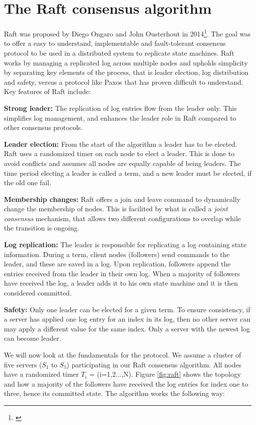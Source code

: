 \section{The Raft consensus algorithm}

Raft was proposed by Diego Ongaro and John Ousterhout in 2014\footnote{\cite{Ongaro2014}}. The goal was to offer a easy to understand, implementable and fault-tolerant consensus protocol to be used in a distributed system to replicate state machines. Raft works by managing a replicated log across multiple nodes and upholds simplicity by separating key elements of the process, that is leader election, log distribution and safety, versus a protocol like Paxos that has proven difficult to understand. Key features of Raft include:

\noindent \textbf{Strong leader:} The replication of log entries flow from the leader only. This simplifies log management, and enhances the leader role in Raft compared to other consensus protocols.

\noindent \textbf{Leader election:} From the start of the algorithm a leader has to be elected. Raft uses a randomized timer on each node to elect a leader. This is done to avoid conflicts and assumes all nodes are equally capable of being leaders. The time period electing a leader is called a term, and a new leader must be elected, if the old one fail.

\noindent \textbf{Membership changes:} Raft offers a join and leave command to dynamically change the membership of nodes. This is facilited by what is called a \textit{joint consensus} mechanism, that allows two different configurations to overlap while the transition is ongoing.

\noindent \textbf{Log replication:} The leader is responsible for replicating a log containing state information. During a term, client nodes (followers) send commands to the leader, and these are saved in a log. Upon replication, followers append the entries received from the leader in their own log. When a majority of followers have received the log, a leader adds it to his own state machine and it is then considered committed.

\noindent \textbf{Safety:} Only one leader can be elected for a given term. To ensure consistency, if a server has applied one log entry for an index in its log, then no other server can may apply a different value for the same index. Only a server with the newest log can become leader.

\noindent We will now look at the fundamentals for the protocol. We assume a cluster of five servers ($S_1$ to $S_5$) participating in our Raft consensus algorithm. All nodes have a randomized timer $T_i$ = (i=1,2...,N). Figure \ref{fig:raft} shows the topology and how a majority of the followers have received the log entries for index one to three, hence its committed state. The algorithm works the following way:

